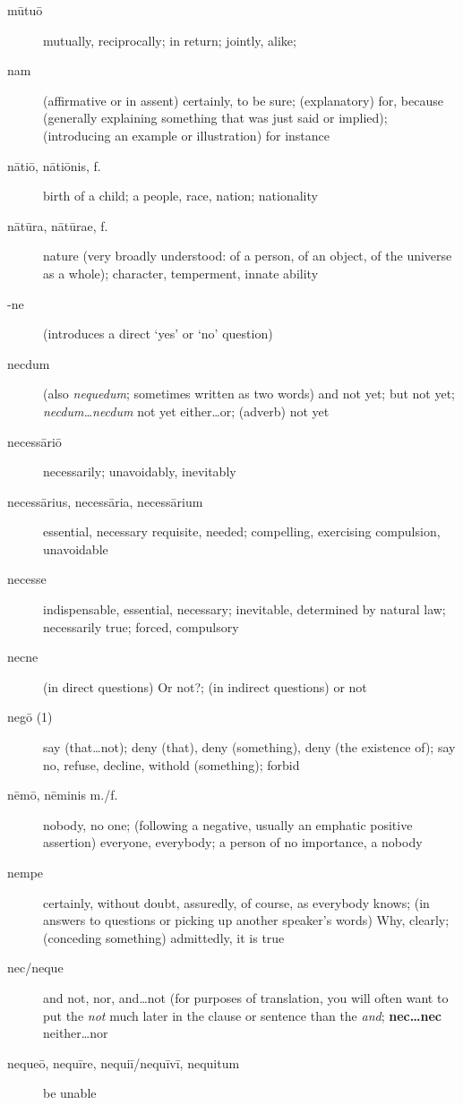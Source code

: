 \begin{description}
    \item[mūtuō] mutually, reciprocally; in return; jointly, alike;
    \item[nam] \marginnote{*}(affirmative or in assent) certainly, to be sure; (explanatory) for, because (generally explaining something that was just said or implied); (introducing an example or illustration) for instance
    \item[nātiō, nātiōnis, f.] birth of a child; a people, race, nation; nationality
    \item[nātūra, nātūrae, f.] \marginnote{*}nature (very broadly understood: of a person, of an object, of the universe as a whole); character, temperment, innate ability
    \item[-ne] \marginnote{*}(introduces a direct `yes' or `no' question)
    \item[necdum] (also \textit{nequedum}; sometimes written as two words) and not yet; but not yet; \textit{necdum\dots necdum} not yet either\dots or; (adverb) not yet
    \item[necessāriō] necessarily; unavoidably, inevitably
    \item[necessārius, necessāria, necessārium] essential, necessary requisite, needed; compelling, exercising compulsion, unavoidable
    \item[necesse] \marginnote{*}indispensable, essential, necessary; inevitable, determined by natural law; necessarily true; forced, compulsory
    \item[necne] (in direct questions) Or not?; (in indirect questions) or not
    \item[negō (1)] \marginnote{*}say (that\dots not); deny (that), deny (something), deny (the existence of); say no, refuse, decline, withold (something); forbid
    \item[nēmō, nēminis m./f.] \marginnote{*}nobody,  no one; (following a negative, usually an emphatic positive assertion) everyone, everybody; a person of no importance, a nobody
    \item[nempe] certainly, without doubt, assuredly, of course, as everybody knows; (in answers to questions or picking up another speaker's words) Why, clearly; (conceding something) admittedly, it is true
    \item[nec/neque] \marginnote{*}and not, nor, and\dots not (for purposes of translation, you will often want to put the \textit{not} much later in the clause or sentence than the \textit{and}; \textbf{nec\dots nec} neither\dots nor
    \item[nequeō, nequīre, nequiī/nequīvī, nequitum] be unable

\end{description}
